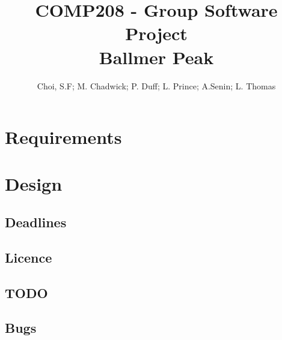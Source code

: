\documentclass[openany]{book}
\title{COMP208 - Group Software Project\\Ballmer Peak}
\author{Choi, S.F; M. Chadwick; P. Duff; L. Prince; A.Senin; L. Thomas}
\begin{document}
\maketitle
\tableofcontents

\part{Requirements}


\part{Design}


\begin{appendices}
\appendixpage %
\noappendicestocpagenum %
\addappheadtotoc %

\chapter{Deadlines}

\chapter{Licence}

\chapter{TODO}

\chapter{Bugs}


\end{appendices}

\listoftodos
\todototoc
\end{document}
